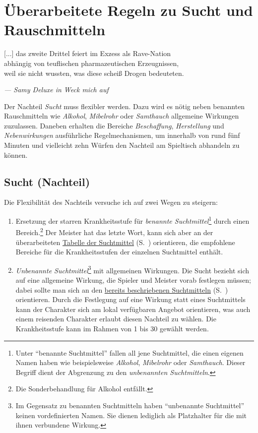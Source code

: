 \chapter{Überarbeitete Regeln zu Sucht und Rauschmitteln}
\epigraph{[...] das zweite Drittel feiert im Exzess als Rave-Nation \\
abhängig von teuflischen pharmazeutischen Erzeugnissen, \\
weil sie nicht wussten, was diese scheiß Drogen bedeuteten.}{\emph{--- Samy Deluxe in \emph{Weck mich auf}}}
\noindent Der Nachteil \emph{Sucht} muss flexibler werden. Dazu wird es nötig neben benannten Rauschmitteln wie \emph{Alkohol}, \emph{Mibelrohr} oder \emph{Samthauch} allgemeine Wirkungen zuzulassen. Daneben erhalten die Bereiche \emph{Beschaffung}, \emph{Herstellung} und \emph{Nebenwirkungen} ausführliche Regelmechanismen, um innerhalb von rund fünf Minuten und vielleicht zehn Würfen den Nachteil am Spieltisch abhandeln zu können.

\section{Sucht (Nachteil)}
Die Flexibilität des Nachteils versuche ich auf zwei Wegen zu steigern:
\begin{enumerate}
	\item Ersetzung der starren Krankheitsstufe für \emph{benannte Suchtmittel}\footnote{Unter \enquote{benannte Suchtmittel} fallen all jene Suchtmittel, die einen eigenen Namen haben wie beispielsweise \emph{Alkohol}, \emph{Mibelrohr} oder \emph{Samthauch}. Dieser Begriff dient der Abgrenzung zu den \emph{unbenannten Suchtmitteln}.} durch einen Bereich.\footnote{Die Sonderbehandlung für Alkohol entfällt.} Der Meister hat das letzte Wort, kann sich aber an der überarbeiteten \hyperref[tbl-suchtmittel-revised]{Tabelle der Suchtmittel} (S.~\pageref{tbl-suchtmittel-revised}) orientieren, die empfohlene Bereiche für die Krankheitsstufen der einzelnen Suchtmittel enthält.
	\item \emph{Unbenannte Suchtmittel}\footnote{Im Gegensatz zu benannten Suchtmitteln haben \enquote{unbenannte Suchtmittel} keinen vordefinierten Namen. Sie dienen lediglich als Platzhalter für die mit ihnen verbundene Wirkung.} mit allgemeinen Wirkungen. Die Sucht bezieht sich auf eine allgemeine Wirkung, die Spieler und Meister vorab festlegen müssen; dabei sollte man sich an den \hyperref[tbl-suchtmittel]{bereits beschriebenen Suchtmitteln} (S.~\pageref{tbl-suchtmittel}) orientieren. Durch die Festlegung auf eine Wirkung statt eines Suchtmittels kann der Charakter sich am lokal verfügbaren Angebot orientieren, was auch einem reisenden Charakter erlaubt diesen Nachteil zu wählen. Die Krankheitsstufe kann im Rahmen von 1 bis 30 gewählt werden.
\end{enumerate}

